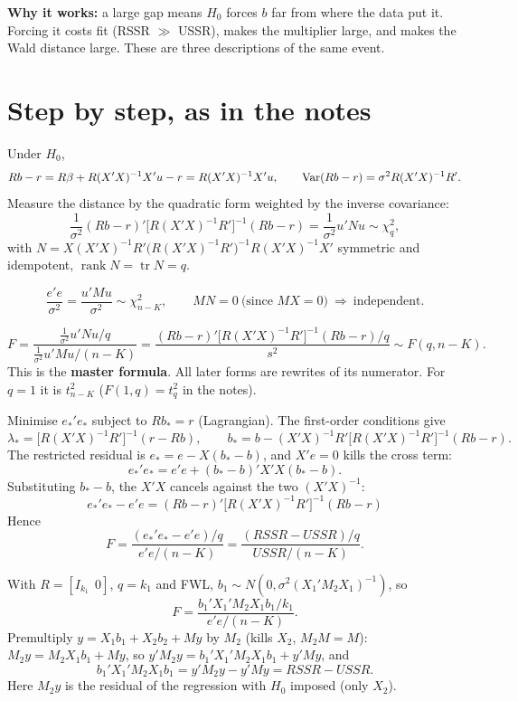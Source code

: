\documentclass[11pt]{article}
\begin{document}
\begin{why}
\textbf{Why it works:} a large gap means $H_0$ forces $b$ far from where the data put it.
Forcing it costs fit (RSSR $\gg$ USSR), makes the multiplier large, and makes the Wald
distance large. These are three descriptions of the same event.
\end{why}

\section{Step by step, as in the notes}

Under $H_0$,
\[ Rb-r=R\beta+R(X'X)^{-1}X'u-r=R(X'X)^{-1}X'u,\qquad
   \operatorname{Var}(Rb-r)=\sigma^{2}R(X'X)^{-1}R'. \]
Measure the distance by the quadratic form weighted by the inverse covariance:
\[ \frac{1}{\sigma^{2}}(Rb-r)'\bigl[R(X'X)^{-1}R'\bigr]^{-1}(Rb-r)=\frac{1}{\sigma^{2}}u'Nu\sim\chi^{2}_{q},\]
with $N=X(X'X)^{-1}R'\bigl(R(X'X)^{-1}R'\bigr)^{-1}R(X'X)^{-1}X'$ symmetric and idempotent,
$\operatorname{rank}N=\operatorname{tr}N=q$.

\[ \frac{e'e}{\sigma^{2}}=\frac{u'Mu}{\sigma^{2}}\sim\chi^{2}_{n-K},\qquad MN=0\ \text{(since }MX=0)\ \Rightarrow\ \text{independent.}\]

\[ F=\frac{\frac{1}{\sigma^{2}}u'Nu/q}{\frac{1}{\sigma^{2}}u'Mu/(n-K)}
    =\frac{(Rb-r)'\bigl[R(X'X)^{-1}R'\bigr]^{-1}(Rb-r)/q}{s^{2}}\sim F(q,n-K). \]
This is the \textbf{master formula}. All later forms are rewrites of its numerator.
For $q=1$ it is $t^{2}_{n-K}$ ($F(1,q)=t_q^{2}$ in the notes).

Minimise $e_*'e_*$ subject to $Rb_*=r$ (Lagrangian). The first-order conditions give
\[ \lambda_*=\bigl[R(X'X)^{-1}R'\bigr]^{-1}(r-Rb),\qquad
   b_*=b-(X'X)^{-1}R'\bigl[R(X'X)^{-1}R'\bigr]^{-1}(Rb-r). \]
The restricted residual is $e_*=e-X(b_*-b)$, and $X'e=0$ kills the cross term:
\[ e_*'e_*=e'e+(b_*-b)'X'X(b_*-b). \]
Substituting $b_*-b$, the $X'X$ cancels against the two $(X'X)^{-1}$:
\[ \boxed{\,e_*'e_*-e'e=(Rb-r)'\bigl[R(X'X)^{-1}R'\bigr]^{-1}(Rb-r)\,} \]
Hence
\[ F=\frac{(e_*'e_*-e'e)/q}{e'e/(n-K)}=\frac{(RSSR-USSR)/q}{USSR/(n-K)}. \]

With $R=[I_{k_1}\ \ 0]$, $q=k_1$ and FWL, $b_1\sim N(0,\sigma^{2}(X_1'M_2X_1)^{-1})$, so
\[ F=\frac{b_1'X_1'M_2X_1b_1/k_1}{e'e/(n-K)}. \]
Premultiply $y=X_1b_1+X_2b_2+My$ by $M_2$ (kills $X_2$, $M_2M=M$):
$M_2y=M_2X_1b_1+My$, so $y'M_2y=b_1'X_1'M_2X_1b_1+y'My$, and
\[ b_1'X_1'M_2X_1b_1=y'M_2y-y'My=RSSR-USSR. \]
Here $M_2y$ is the residual of the regression with $H_0$ imposed (only $X_2$).
\end{document}

